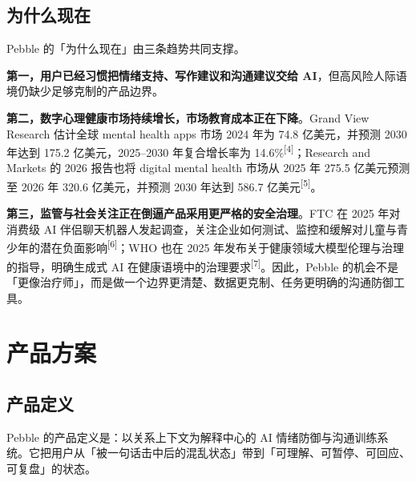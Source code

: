 \documentclass[UTF8,11pt,a4paper]{ctexart}
\newcommand{\refnum}[1]{\textsuperscript{\textcolor{PebbleAccent}{[#1]}}}
\begin{document}
\subsection{为什么现在}

Pebble 的「为什么现在」由三条趋势共同支撑。

\textbf{第一，用户已经习惯把情绪支持、写作建议和沟通建议交给 AI}，但高风险人际语境仍缺少足够克制的产品边界。

\textbf{第二，数字心理健康市场持续增长，市场教育成本正在下降}。Grand View Research 估计全球 mental health apps 市场 2024 年为 74.8 亿美元，并预测 2030 年达到 175.2 亿美元，2025--2030 年复合增长率为 14.6\%\refnum{4}；Research and Markets 的 2026 报告也将 digital mental health 市场从 2025 年 275.5 亿美元预测至 2026 年 320.6 亿美元，并预测 2030 年达到 586.7 亿美元\refnum{5}。

\textbf{第三，监管与社会关注正在倒逼产品采用更严格的安全治理}。FTC 在 2025 年对消费级 AI 伴侣聊天机器人发起调查，关注企业如何测试、监控和缓解对儿童与青少年的潜在负面影响\refnum{6}；WHO 也在 2025 年发布关于健康领域大模型伦理与治理的指导，明确生成式 AI 在健康语境中的治理要求\refnum{7}。因此，Pebble 的机会不是「更像治疗师」，而是做一个边界更清楚、数据更克制、任务更明确的沟通防御工具。

\section{产品方案}

\subsection{产品定义}

Pebble 的产品定义是：以关系上下文为解释中心的 AI 情绪防御与沟通训练系统。它把用户从「被一句话击中后的混乱状态」带到「可理解、可暂停、可回应、可复盘」的状态。
\end{document}

